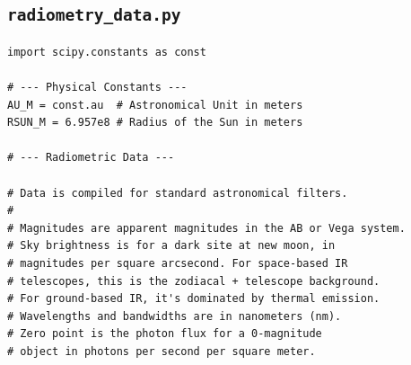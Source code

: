 \documentclass[11pt]{article}
\begin{document}
\subsection{\texttt{radiometry\_data.py}}
\begin{Verbatim}
import scipy.constants as const

# --- Physical Constants ---
AU_M = const.au  # Astronomical Unit in meters
RSUN_M = 6.957e8 # Radius of the Sun in meters

# --- Radiometric Data ---

# Data is compiled for standard astronomical filters.
#
# Magnitudes are apparent magnitudes in the AB or Vega system.
# Sky brightness is for a dark site at new moon, in
# magnitudes per square arcsecond. For space-based IR
# telescopes, this is the zodiacal + telescope background.
# For ground-based IR, it's dominated by thermal emission.
# Wavelengths and bandwidths are in nanometers (nm).
# Zero point is the photon flux for a 0-magnitude
# object in photons per second per square meter.


\end{Verbatim}
\end{document}

